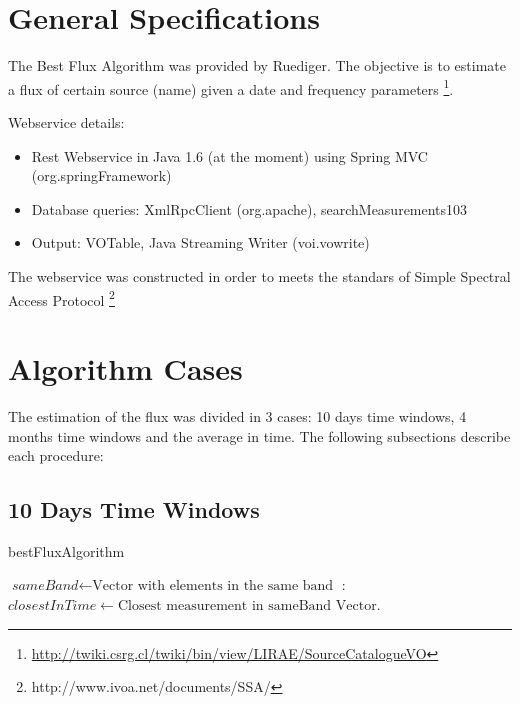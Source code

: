 \documentclass[10pt]{article}
\title{
\center{\emph{Best Flux Algorithm} \\}
\author{
        Ruediger Kneissl, Jonathan Antognini\\
}}
\begin{document}
\maketitle

\section{General Specifications}

The Best Flux Algorithm was provided by Ruediger. The objective is to estimate
a flux of certain source (name) given a date and frequency parameters
\footnote{\url{http://twiki.csrg.cl/twiki/bin/view/LIRAE/SourceCatalogueVO}}.

Webservice details:
\begin{itemize}
 \item Rest Webservice in Java 1.6 (at the moment) using Spring MVC (org.springFramework)
 \item Database queries: XmlRpcClient (org.apache), searchMeasurements103
 \item Output: VOTable, Java Streaming Writer (voi.vowrite)
\end{itemize}

The webservice was constructed in order to meets the standars of Simple
Spectral Access Protocol \footnote{http://www.ivoa.net/documents/SSA/}

\section{Algorithm Cases}

The estimation of the flux was divided in 3 cases: 10 days time windows, 4
months time windows and the average in time. The following subsections describe
each procedure:

\subsection{10 Days Time Windows}
\begin{algorithm}
\caption{bestFluxAlgorithm}\label{10days}
\begin{algorithmic}[1]
\State $\textit{sameBand} \gets \text{Vector with elements in the same band}$
: 
\State $closestInTime \gets \text{Closest measurement in sameBand Vector}$.
\Statex
\State {}
\Else
\State {}
\EndIf
\EndProcedure
\end{algorithmic}
\end{algorithm}
\end{document}
